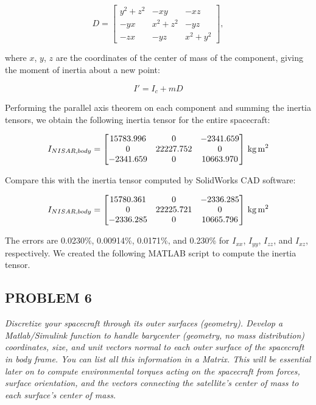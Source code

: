 \begin{equation*}
D =
\begin{bmatrix}
y^{2} + z^{2} & -xy & -xz \\
-yx & x^{2} + z^{2} & -yz \\
-zx & -yz & x^{2} + y^{2}
\end{bmatrix},
\end{equation*}

where $x$, $y$, $z$ are the coordinates of the center of mass of the component, giving the moment of inertia about a new point:

\begin{equation*}
    I' = I_{c} + mD
\end{equation*}

Performing the parallel axis theorem on each component and summing the inertia tensors, we obtain the following inertia tensor for the entire spacecraft:

\begin{equation*}
I_{NISAR,body} =
\qty[parse-numbers = false]{
\begin{bmatrix}
15783.996 & 0 & -2341.659 \\
0 & 22227.752 & 0 \\
-2341.659 & 0 & 10663.970
\end{bmatrix}
}{\kilogram\metre\squared}
\end{equation*}

Compare this with the inertia tensor computed by SolidWorks CAD software:

\begin{equation*}
I_{NISAR,body} =
\qty[parse-numbers = false]{
\begin{bmatrix}
15780.361 & 0 & -2336.285 \\
0 & 22225.721 & 0 \\
-2336.285 & 0 & 10665.796
\end{bmatrix}
}{\kilogram\metre\squared}
\end{equation*}

The errors are 0.0230\%, 0.00914\%, 0.0171\%, and 0.230\% for $I_{xx}$, $I_{yy}$, $I_{zz}$, and $I_{xz}$, respectively. We created the following MATLAB script to compute the inertia tensor.



\subsection{PROBLEM 6}
\textit{Discretize your spacecraft through its outer surfaces (geometry). Develop a Matlab/Simulink function to handle barycenter (geometry, no mass distribution) coordinates, size, and unit vectors normal to each outer surface of the spacecraft in body frame. You can list all this information in a Matrix. This will be essential later on to compute environmental torques acting on the spacecraft from forces, surface orientation, and the vectors connecting the satellite’s center of mass to each surface’s center of mass.}

